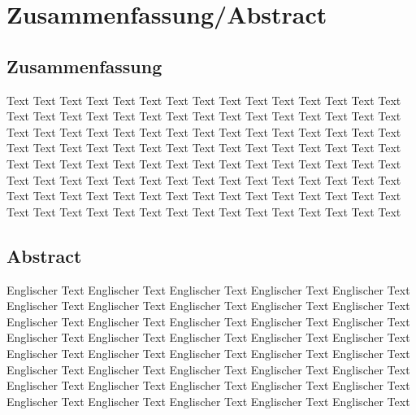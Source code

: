 \chapter{Zusammenfassung/Abstract}
    \section{Zusammenfassung}
        Text Text Text Text Text Text Text Text Text Text Text Text Text Text Text Text Text Text Text Text Text Text Text Text 
        Text Text Text Text Text Text Text Text Text Text Text Text Text Text Text Text Text Text Text Text Text Text Text Text
        Text Text Text Text Text Text Text Text Text Text Text Text Text Text Text Text Text Text Text Text Text Text Text Text
        Text Text Text Text Text Text Text Text Text Text Text Text Text Text Text Text Text Text Text Text Text Text Text Text
        Text Text Text Text Text Text Text Text Text Text Text Text Text Text Text Text Text Text Text Text Text Text Text Text
    \section{Abstract}
        Englischer Text Englischer Text Englischer Text Englischer Text Englischer Text Englischer Text Englischer Text Englischer Text             
        Englischer Text Englischer Text Englischer Text Englischer Text Englischer Text Englischer Text Englischer Text Englischer Text 
        Englischer Text Englischer Text Englischer Text Englischer Text Englischer Text Englischer Text Englischer Text Englischer Text 
        Englischer Text Englischer Text Englischer Text Englischer Text Englischer Text Englischer Text Englischer Text Englischer Text 
        Englischer Text Englischer Text Englischer Text Englischer Text Englischer Text Englischer Text Englischer Text Englischer Text 